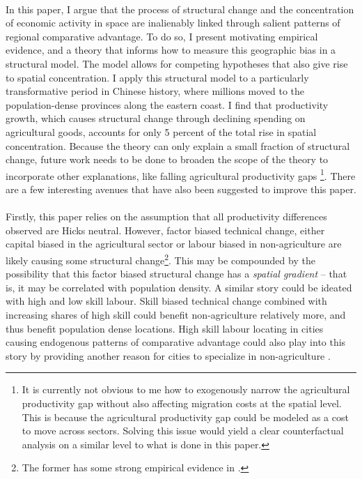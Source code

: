 \documentclass[]{article}
\theoremstyle{plain}
\begin{document}
\paragraph*{}
In this paper, I argue that the process of structural change and the concentration of economic activity in space are inalienably linked through salient patterns of regional comparative advantage. To do so, I present motivating empirical evidence, and a theory that informs how to measure this geographic bias in a structural model. The model allows for competing hypotheses that also give rise to spatial concentration. I apply this structural model to a particularly transformative period in Chinese history, where millions moved to the population-dense provinces along the eastern coast. I find that productivity growth, which causes structural change through declining spending on agricultural goods, accounts for only 5 percent of the total rise in spatial concentration. Because the theory can only explain a small fraction of structural change, future work needs to be done to broaden the scope of the theory to incorporate other explanations, like falling agricultural productivity gaps \citep{AgProdGap}\footnote{It is currently not obvious to me how to exogenously narrow the agricultural productivity gap without also affecting migration costs at the spatial level. This is because the agricultural productivity gap could be modeled as a cost to move across sectors. Solving this issue would yield a clear counterfactual analysis on a similar level to what is done in this paper.}. There are a few interesting avenues that have also been suggested to improve this paper. 
\paragraph*{}
Firstly, this paper relies on the assumption that all productivity differences observed are Hicks neutral. However, factor biased technical change, either capital biased in the agricultural sector or labour biased in non-agriculture are likely causing some structural change\footnote{The former has some strong empirical evidence in \citet{bustos1996etal}.}. This may be compounded by the possibility that this factor biased structural change has a \textit{spatial gradient} -- that is, it may be correlated with population density. A similar story could be ideated with high and low skill labour. Skill biased technical change combined with increasing shares of high skill could benefit non-agriculture relatively more, and thus benefit population dense locations. High skill labour locating in cities causing endogenous patterns of comparative advantage could also play into this story by providing another reason for cities to specialize in non-agriculture \citep{davisdingel2019}. 
\end{document}
